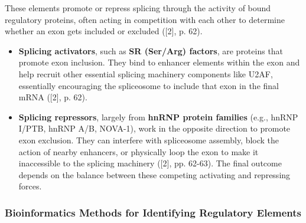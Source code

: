 \documentclass[12pt,a4paper]{article}
\begin{document}
These elements promote or repress splicing through the activity of bound regulatory proteins, often acting in competition with each other to determine whether an exon gets included or excluded ([2], p. 62).
\begin{itemize}
    \item \textbf{Splicing activators}, such as \textbf{SR (Ser/Arg) factors}, are proteins that promote exon inclusion. They bind to enhancer elements within the exon and help recruit other essential splicing machinery components like U2AF, essentially encouraging the spliceosome to include that exon in the final mRNA ([2], p. 62).
    \item \textbf{Splicing repressors}, largely from \textbf{hnRNP protein families} (e.g., hnRNP I/PTB, hnRNP A/B, NOVA-1), work in the opposite direction to promote exon exclusion. They can interfere with spliceosome assembly, block the action of nearby enhancers, or physically loop the exon to make it inaccessible to the splicing machinery ([2], pp. 62-63). The final outcome depends on the balance between these competing activating and repressing forces.
\end{itemize}

\subsubsection{Bioinformatics Methods for Identifying Regulatory Elements}
\end{document}
